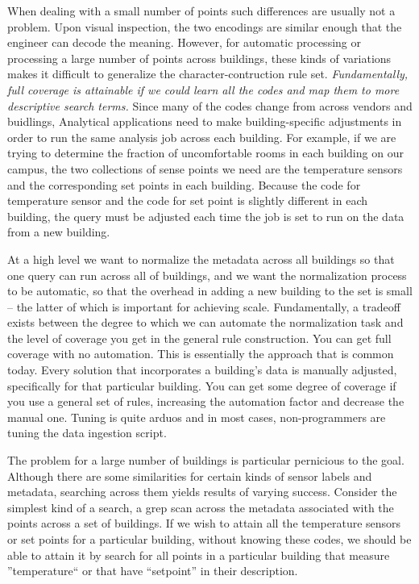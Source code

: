 
When dealing with a small number of points such differences are usually not a problem.  Upon 
visual inspection, the two
encodings are similar enough that the engineer can decode the meaning.  However, for automatic 
processing or processing a large number of points across buildings, these kinds of 
variations makes it difficult to generalize the character-contruction rule set.  
\emph{Fundamentally, full coverage is attainable if we could learn all the codes and map
them to more descriptive search terms.}
Since many of the codes change from across vendors and buidlings, Analytical applications 
need to make building-specific adjustments in order to run the same analysis job across each
building.  For example, if we are trying to determine the fraction of uncomfortable rooms
in each building on our campus, the two collections of sense points we need are the temperature
sensors and the corresponding set points in each building.  Because the code for temperature
sensor and the code for set point is slightly different in each building, the query
must be adjusted each time the job is set to run on the data from a new building.

At a high level we want to normalize the metadata across all buildings so that one query
can run across all of buildings, and we want the normalization process to be automatic, so that
the overhead in adding a new building to the set is small -- the latter of which is important
for achieving scale.  Fundamentally, a tradeoff exists between the degree to which we can 
automate the normalization task and the level of coverage you get in the general 
rule construction.  You can get full coverage with no automation.  This is essentially the approach
that is common today.  Every solution that incorporates a building's data is manually
adjusted, specifically for that particular building.  You can get some degree of coverage if you
use a general set of rules, increasing the automation factor and decrease the manual one.
Tuning is quite arduos and in most cases, non-programmers are tuning the data ingestion script.

The problem for a large number of buildings is particular pernicious to the goal. Although 
there are some similarities for certain kinds of sensor
labels and metadata, searching across them yields results of varying success.  Consider the 
simplest kind of a search, a grep scan across the metadata associated with the points
across a set of buildings.  If we wish to attain all the temperature sensors or set points
for a particular building, without knowing these codes, we should be able to attain
it by search for all points in a particular building that measure ''temperature`` or
that have ``setpoint'' in their description.

